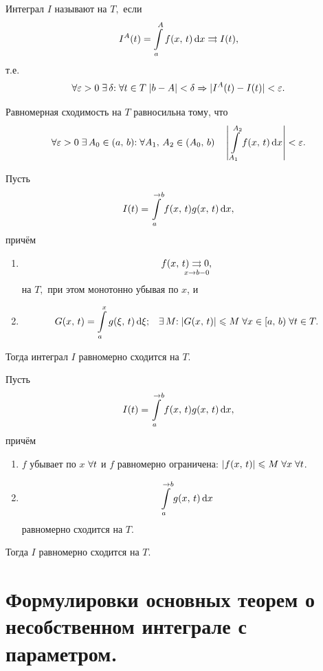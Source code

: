 \documentclass{notes}
\begin{document}
	\begin{de}
		Интеграл $I$ называют  на $T,$ если 
		\[
			I^{A}(t) = \int\limits_{a}^A f(x, \, t) \, \mathrm{d} x \rightrightarrows I(t),
		\]
		т.е.
		\[
			\forall \varepsilon > 0 \; \exists \, \delta\text{\text{:}} \; \forall t\in T \;  |b - A| < \delta \Rightarrow |I^A(t) - I(t)| < \varepsilon.
		\]

		\begin{thm}
			Равномерная сходимость на $T$ равносильна тому, что
			\[
				\forall \varepsilon > 0 \; \exists \, A_0 \in (a, \, b)\text{\text{:}} \; \forall A_1, \, A_2 \in (A_0, \, b) \quad \left|\, \int\limits_{A_1}^{A_2} f(x, \, t) \, \mathrm{d} x \right| < \varepsilon.
			\]
		\end{thm}

		\begin{thm}[Дирихле]
			Пусть 
			\[
				I(t) = \int\limits_{a}^{\to b} f(x, \, t) g(x, \, t) \, \mathrm{d} x,
			\]
			причём
			\begin{enumerate}
				\item
				\[
					f(x, \, t) \underset{\mathclap{x \to b - 0}}{\rightrightarrows} 0,
				\]
				на $T,$ при этом монотонно убывая по $x$, и
				\item 
				\[
					G(x, \, t) = \int\limits_a^x g(\xi, \, t) \, \mathrm{d} \xi \text{\text{;}} \quad \exists \, M\text{\text{:}} \; |G(x, \, t)| \leqslant M \; \forall x \in [a, \, b) \; \forall t \in T. 
				\]
			\end{enumerate}
			Тогда интеграл $I$ равномерно сходится на $T$.
		\end{thm}

		\begin{thm}[Абеля]
			Пусть 
			\[
				I(t) = \int\limits_{a}^{\to b} f(x, \, t) g(x, \, t) \, \mathrm{d} x,
			\]
			причём
			\begin{enumerate}
				\item $f$ убывает по $x$ $\forall t$ и $f$ равномерно ограничена: $|f(x, \, t)| \leqslant M \; \forall x \; \forall t$.
				\item 
				\[
					\int\limits_{a}^{\to b} g(x, \, t) \, \mathrm{d} x
				\]
				равномерно сходится на $T$.
			\end{enumerate}
			Тогда $I$ равномерно сходится на $T$.
		\end{thm}
	\end{de}

\section{Формулировки основных теорем о несобственном интеграле с параметром.}
	
\end{document}

